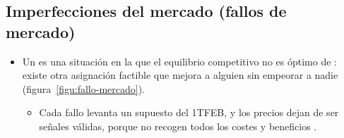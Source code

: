 \documentclass[11pt]{article}
\begin{document}
\subsection{Imperfecciones del mercado (fallos de mercado)}\label{sec:fallos-mercado}

\begin{itemize}
\item Un  es una situación en la que el equilibrio competitivo no es óptimo de : existe otra asignación factible que mejora a alguien sin empeorar a nadie (figura~\ref{figu:fallo-mercado}).
  \begin{itemize}
  \item Cada fallo levanta un supuesto del 1TFEB, y los precios dejan de ser señales válidas, porque no recogen todos los costes y beneficios .
  \end{itemize}
\end{itemize}

\begin{infografia}[H]
\centering
\caption{El fallo de mercado: el equilibrio walrasiano deja de ser un óptimo de }\label{figu:fallo-mercado}
\end{infografia}
\end{document}
